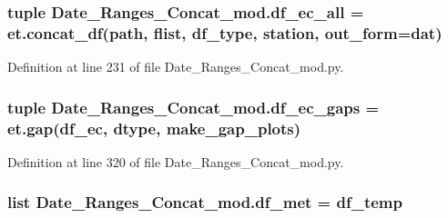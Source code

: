 \hypertarget{namespace_date___ranges___concat__mod_a7c91d56e0b9e1c43d259ab47198f0e34}{}
\subsubsection[{df\+\_\+ec\+\_\+all}]{\setlength{\rightskip}{0pt plus 5cm}tuple Date\+\_\+\+Ranges\+\_\+\+Concat\+\_\+mod.\+df\+\_\+ec\+\_\+all = et.\+concat\+\_\+df({\bf path}, {\bf flist}, {\bf df\+\_\+type}, {\bf station}, out\+\_\+form=\textquotesingle{}dat\textquotesingle{})}\label{namespace_date___ranges___concat__mod_a7c91d56e0b9e1c43d259ab47198f0e34}


Definition at line 231 of file Date\+\_\+\+Ranges\+\_\+\+Concat\+\_\+mod.\+py.

\hypertarget{namespace_date___ranges___concat__mod_aee5ba06c181fca25a1387e17ff13e63e}{}
\subsubsection[{df\+\_\+ec\+\_\+gaps}]{\setlength{\rightskip}{0pt plus 5cm}tuple Date\+\_\+\+Ranges\+\_\+\+Concat\+\_\+mod.\+df\+\_\+ec\+\_\+gaps = et.\+gap({\bf df\+\_\+ec}, {\bf dtype}, {\bf make\+\_\+gap\+\_\+plots})}\label{namespace_date___ranges___concat__mod_aee5ba06c181fca25a1387e17ff13e63e}


Definition at line 320 of file Date\+\_\+\+Ranges\+\_\+\+Concat\+\_\+mod.\+py.

\hypertarget{namespace_date___ranges___concat__mod_a64af05128b2ac7948abb0095738ff6d3}{}
\subsubsection[{df\+\_\+met}]{\setlength{\rightskip}{0pt plus 5cm}list Date\+\_\+\+Ranges\+\_\+\+Concat\+\_\+mod.\+df\+\_\+met = {\bf df\+\_\+temp}}\label{namespace_date___ranges___concat__mod_a64af05128b2ac7948abb0095738ff6d3}



